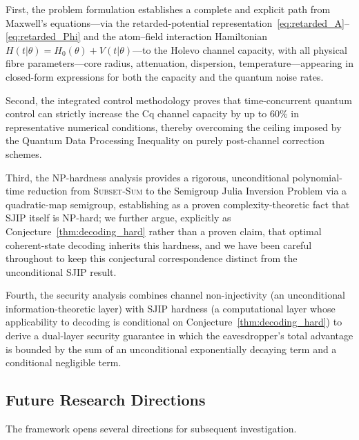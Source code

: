 \documentclass[journal,twocolumn]{IEEEtran}
\theoremstyle{definition}
\theoremstyle{plain}
\begin{document}
First, the problem formulation establishes a complete and explicit
path from Maxwell's equations---via the retarded-potential
representation~\eqref{eq:retarded_A}--\eqref{eq:retarded_Phi} and
the atom--field interaction Hamiltonian $H(t|\theta) = H_0(\theta)
+ V(t|\theta)$---to the Holevo channel capacity, with all physical
fibre parameters---core radius, attenuation, dispersion,
temperature---appearing in closed-form expressions for both the
capacity and the quantum noise rates.  

Second, the integrated
control methodology proves that time-concurrent quantum control can
strictly increase the Cq channel capacity by up to 60\% in
representative numerical conditions, thereby overcoming the ceiling
imposed by the Quantum Data Processing Inequality on purely
post-channel correction schemes.  

Third, the NP-hardness analysis
provides a rigorous, unconditional polynomial-time reduction from
\textsc{Subset-Sum} to the Semigroup Julia Inversion Problem via a
quadratic-map semigroup, establishing as a proven complexity-theoretic
fact that SJIP itself is NP-hard; we further argue, explicitly as
Conjecture~\ref{thm:decoding_hard} rather than a proven claim, that
optimal coherent-state decoding inherits this hardness, and we have
been careful throughout to keep this conjectural correspondence
distinct from the unconditional SJIP result. 

Fourth, the security
analysis combines channel non-injectivity (an unconditional
information-theoretic layer) with SJIP hardness (a computational
layer whose applicability to decoding is conditional on
Conjecture~\ref{thm:decoding_hard}) to derive a dual-layer security
guarantee in which the eavesdropper's total advantage is bounded by
the sum of an unconditional exponentially decaying term and a
conditional negligible term.

\subsection{Future Research Directions}

The framework opens several directions for subsequent investigation.
\end{document}
